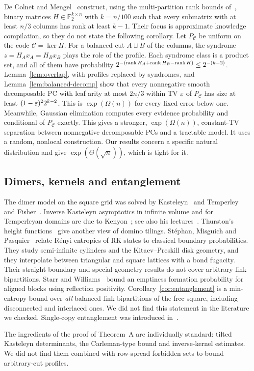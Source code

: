 De Colnet and Mengel~\cite[Sec.~5]{DeColnetMengel20} construct, using the multi-partition rank bounds of~\cite{DurisEtAl04}, binary matrices $H\in\mathbb F_2^{k\times n}$ with $k=n/100$ such that every submatrix with at least $n/3$ columns has rank at least $k-1$. Their focus is approximate knowledge compilation, so they do not state the following corollary. Let $P_{\mathcal C}$ be uniform on the code $\mathcal C=\ker H$. For a balanced cut $A\sqcup B$ of the columns, the syndrome $z=H_Ax_A=H_Bx_B$ plays the role of the profile. Each syndrome class is a product set, and all of them have probability $2^{-(\operatorname{rank} H_A+\operatorname{rank} H_B-\operatorname{rank} H)}\le2^{-(k-2)}$. Lemma~\ref{lem:overlap}, with profiles replaced by syndromes, and Lemma~\ref{lem:balanced-decomp} show that every nonnegative smooth decomposable PC with leaf arity at most $2n/3$ within TV $\varepsilon$ of $P_{\mathcal C}$ has size at least $(1-\varepsilon)^22^{k-2}$. This is $\exp(\Omega(n))$ for every fixed error below one. Meanwhile, Gaussian elimination computes every evidence probability and conditional of $P_{\mathcal C}$ exactly. This gives a stronger, $\exp(\Omega(n))$, constant-TV separation between nonnegative decomposable PCs and a tractable model. It uses a random, nonlocal construction. Our results concern a specific natural distribution and give $\exp(\Theta(\sqrt n))$, which is tight for it.

\subsection{Dimers, kernels and entanglement}\label{sec:related-physics}

The dimer model on the square grid was solved by Kasteleyn~\cite{Kasteleyn61} and Temperley and Fisher~\cite{TemperleyFisher61,Fisher61}. Inverse Kasteleyn asymptotics in infinite volume and for Temperleyan domains are due to Kenyon~\cite{Kenyon97,Kenyon00}; see also his lectures~\cite{KenyonLectures}. Thurston's height functions~\cite{Thurston90} give another view of domino tilings. Stéphan, Misguich and Pasquier~\cite{StephanMisguichPasquier12} relate R\'enyi entropies of RK states to classical boundary probabilities. They study semi-infinite cylinders and the Kitaev--Preskill disk geometry, and they interpolate between triangular and square lattices with a bond fugacity. Their straight-boundary and special-geometry results do not cover arbitrary link bipartitions. Starr and Williams~\cite{StarrWilliams18} bound an emptiness formation probability for aligned blocks using reflection positivity. Corollary~\ref{cor:entanglement} is a min-entropy bound over \emph{all} balanced link bipartitions of the free square, including disconnected and interlaced ones. We did not find this statement in the literature we checked. Single-copy entanglement was introduced in~\cite{EisertCramer05}.

The ingredients of the proof of Theorem~A are individually standard: tilted Kasteleyn determinants, the Carleman-type bound and inverse-kernel estimates. We did not find them combined with row-spread forbidden sets to bound arbitrary-cut profiles.
